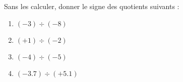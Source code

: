 
\begin{exercice}\label{exosmath-0751}

Sans les calculer, donner le signe des quotients suivants :

\begin{multicols}{2}
    \begin{enumerate}
        \item
            \( (-3)\div(-8) \)
        \item
            \( (+1)\div (-2)\)
        \item
            \( (-4)\div (-5)\)
        \item
            \( (-3.7)\div (+5.1)\)
    \end{enumerate}
\end{multicols}

\end{exercice}
